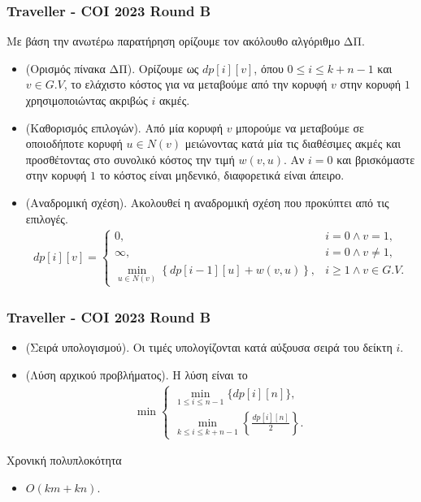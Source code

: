 \documentclass[t]{beamer}
\begin{document}
\begin{frame}
	\frametitle{Traveller - COI 2023 Round B}
	Με βάση την ανωτέρω παρατήρηση ορίζουμε τον ακόλουθο αλγόριθμο ΔΠ.
	\pause
	\begin{itemize}
		\item (Ορισμός πίνακα ΔΠ). Ορίζουμε ως $dp[i][v]$, όπου $0 \leq i \leq k + n - 1$ και $v \in G.V$,
		το ελάχιστο κόστος για να μεταβούμε από την κορυφή $v$ στην κορυφή $1$ χρησιμοποιώντας ακριβώς $i$ ακμές.
		\pause
		\item (Καθορισμός επιλογών). Από μία κορυφή $v$ μπορούμε να μεταβούμε σε οποιοδήποτε κορυφή $u \in N(v)$ μειώνοντας κατά μία τις διαθέσιμες ακμές
		και προσθέτοντας στο συνολικό κόστος την τιμή $w(v, u)$. Αν $i = 0$ και βρισκόμαστε στην κορυφή $1$ το κόστος
		είναι μηδενικό, διαφορετικά είναι άπειρο. 
		\pause 
		\item (Αναδρομική σχέση). Ακολουθεί η αναδρομική σχέση που προκύπτει από τις επιλογές.
		\begin{align*}
			dp[i][v] =
			\begin{cases}
				0, & i = 0 \land v = 1, \\
				\infty, & i = 0 \land v \neq 1, \\
				\displaystyle\min_{u \in N(v)}\left\{dp[i - 1][u] + w(v, u) \right\}, & i \geq 1 \land v \in G.V. 
			\end{cases}
		\end{align*}
		\end{itemize}
\end{frame}

\begin{frame}
	\frametitle{Traveller - COI 2023 Round B}
	\begin{itemize}
		\item (Σειρά υπολογισμού). Οι τιμές υπολογίζονται κατά αύξουσα σειρά του δείκτη $i$.
		\pause
		\item (Λύση αρχικού προβλήματος). Η λύση είναι το
		\begin{align*}
			\min
			\begin{cases}
				\displaystyle\min_{1 \leq i \leq n - 1}\{dp[i][n]\}, \\
				\displaystyle\min_{k \leq i \leq k + n - 1}\left\{\frac{dp[i][n]}{2}\right\}.
			\end{cases}
		\end{align*}
	\end{itemize}
	\pause
	\begin{block}{Χρονική πολυπλοκότητα}
		\begin{itemize}
			\item $O(km + kn)$.			
		\end{itemize}
	\end{block}
	\pause
	\vspace{0.25cm}
	\begin{center}
	\end{center}
\end{frame}
\end{document}
